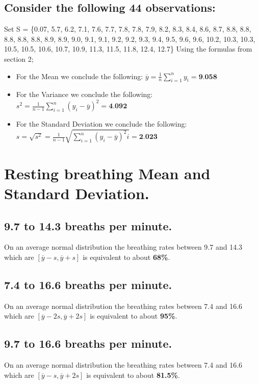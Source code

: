 \documentclass[a4paper,12px] {article}
\begin{document}
\subsection{Consider the following 44 observations:}
Set S = \{0.07, 5.7, 6.2, 7.1, 7.6, 7.7, 7.8, 7.8, 7.9, 8.2, 8.3, 8.4, 8.6, 8.7, 8.8,
 8.8, 8.8, 8.8, 8.8, 8.9, 8.9, 9.0, 9.1, 9.1, 9.2, 9.2, 9.3, 9.4, 9.5, 9.6, 9.6, 10.2,
 10.3, 10.3, 10.5, 10.5, 10.6, 10.7, 10.9, 11.3, 11.5, 11.8, 12.4, 12.7\} \newline
Using the formulas from section 2;
\begin{itemize}
\item  For the Mean we conclude the following: \newline $ \overline{y} = \frac{1}{n} \sum_{i = 1} ^ n y_i = \textbf{9.058} $
\item For the Variance we conclude the following:\newline $ s ^ 2 = \frac{1}{n - 1} \sum_{i = 1} ^ n ( y_i - \overline{y})^2 = \textbf{4.092} $
\item For the Standard Deviation we conclude the following:\newline $ s = \sqrt{s^2} = \frac{1}{n - 1}\sqrt{ \sum_{i = 1} ^ n ( y_i - \overline{y})^2i}= \textbf{2.023} $
\end{itemize}

\section {Resting breathing Mean and Standard Deviation.}
\subsection {9.7 to 14.3 breaths per minute.}
On an average normal distribution the breathing rates between 9.7 and 14.3 which are $[\overline y - s, \overline y + s]$ is equivalent to about \textbf{68\%}.
\subsection {7.4 to 16.6 breaths per minute.}
On an average normal distribution the breathing rates between 7.4 and 16.6 which are $[\overline y - 2s, \overline y + 2s]$ is equivalent to about \textbf{95\%}.
\subsection {9.7 to 16.6 breaths per minute.}
On an average normal distribution the breathing rates between 7.4 and 16.6 which are $[\overline y - s, \overline y + 2s]$ is equivalent to about \textbf{81.5\%}.
\end{document}
